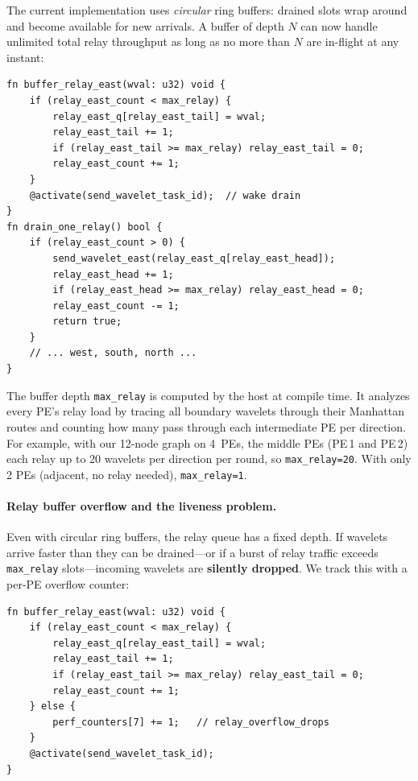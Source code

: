 \documentclass[11pt,letterpaper]{article}
\begin{document}
The current implementation uses \emph{circular} ring buffers: drained slots wrap around and become available for new arrivals. A buffer of depth $N$ can now handle unlimited total relay throughput as long as no more than $N$ are in-flight at any instant:

\begin{lstlisting}[language=CSL, numbers=none]
fn buffer_relay_east(wval: u32) void {
    if (relay_east_count < max_relay) {
        relay_east_q[relay_east_tail] = wval;
        relay_east_tail += 1;
        if (relay_east_tail >= max_relay) relay_east_tail = 0;
        relay_east_count += 1;
    }
    @activate(send_wavelet_task_id);  // wake drain
}
fn drain_one_relay() bool {
    if (relay_east_count > 0) {
        send_wavelet_east(relay_east_q[relay_east_head]);
        relay_east_head += 1;
        if (relay_east_head >= max_relay) relay_east_head = 0;
        relay_east_count -= 1;
        return true;
    }
    // ... west, south, north ...
}
\end{lstlisting}

The buffer depth \texttt{max\_relay} is computed by the host at compile time. It analyzes every PE's relay load by tracing all boundary wavelets through their Manhattan routes and counting how many pass through each intermediate PE per direction. For example, with our 12-node graph on 4~PEs, the middle PEs (PE\,1 and PE\,2) each relay up to 20 wavelets per direction per round, so \texttt{max\_relay=20}. With only 2 PEs (adjacent, no relay needed), \texttt{max\_relay=1}.

\paragraph{Relay buffer overflow and the liveness problem.}
Even with circular ring buffers, the relay queue has a fixed depth. If wavelets arrive faster than they can be drained---or if a burst of relay traffic exceeds \texttt{max\_relay} slots---incoming wavelets are \textbf{silently dropped}. We track this with a per-PE overflow counter:

\begin{lstlisting}[language=CSL, numbers=none]
fn buffer_relay_east(wval: u32) void {
    if (relay_east_count < max_relay) {
        relay_east_q[relay_east_tail] = wval;
        relay_east_tail += 1;
        if (relay_east_tail >= max_relay) relay_east_tail = 0;
        relay_east_count += 1;
    } else {
        perf_counters[7] += 1;   // relay_overflow_drops
    }
    @activate(send_wavelet_task_id);
}
\end{lstlisting}
\end{document}
